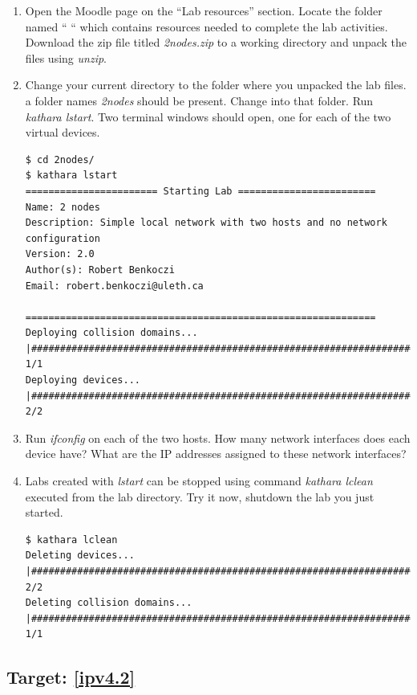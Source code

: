 \documentclass[12pt]{book}
\begin{document}
\begin{enumerate}[label=Activity \arabic*:]
\item Open the Moodle page on the ``Lab resources'' section. Locate the folder named `` `` which contains resources needed to complete the lab activities. Download the zip file titled \emph{2nodes.zip} to a working directory and unpack the files using \emph{unzip}. 
  
\item Change your current directory to the folder where you unpacked
  the lab files. a folder names \emph{2nodes} should be present. Change into that folder. Run \emph{kathara lstart}. Two terminal windows should open, one for each of the two virtual devices.

  \begin{lstlisting}
$ cd 2nodes/
$ kathara lstart
======================= Starting Lab ========================
Name: 2 nodes
Description: Simple local network with two hosts and no network configuration
Version: 2.0
Author(s): Robert Benkoczi
Email: robert.benkoczi@uleth.ca

=============================================================
Deploying collision domains... |##########################################################################| 1/1
Deploying devices... |####################################################################################| 2/2
  \end{lstlisting}

\item Run \emph{ifconfig} on each of the two hosts. How many network interfaces does each device have? What are the IP addresses assigned to these network interfaces?

\item Labs created with \emph{lstart} can be stopped using command \emph{kathara lclean} executed from the lab directory. Try it now, shutdown the lab you just started.

  \begin{lstlisting}
$ kathara lclean
Deleting devices... |#####################################################################################| 2/2
Deleting collision domains... |###########################################################################| 1/1
  \end{lstlisting}

\end{enumerate}

\subsection{Target: \ref{ipv4.2}}\label{ipv4.2.se}
  
\end{document}
